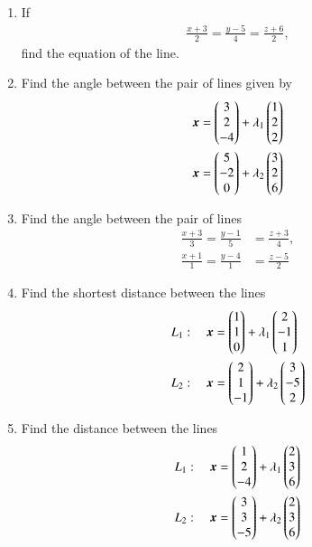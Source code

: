\begin{enumerate}[label=\arabic*.,ref=\thesubsection.\theenumi]
\item If
\begin{align}
\frac{x+3}{2} = \frac{y-5}{4} = \frac{z+6}{2}, 
\end{align}
%
find the equation of the line.
%
\item Find the angle between the pair of lines given by 
\begin{align}
\bm{x} &= \begin{pmatrix}3\\2\\-4\end{pmatrix} + \lambda_1\begin{pmatrix}1 \\ 2 \\2\end{pmatrix}
\\
\bm{x} &= \begin{pmatrix}5\\-2\\0\end{pmatrix} + \lambda_2\begin{pmatrix}3 \\ 2 \\6\end{pmatrix}
\end{align}
%
\item Find the angle between the pair of lines
\begin{align}
\frac{x+3}{3} = \frac{y-1}{5} &= \frac{z+3}{4}, 
\\
\frac{x+1}{1} = \frac{y-4}{1} &= \frac{z-5}{2} 
\end{align}
%
\item Find the shortest distance between the lines 
\begin{align}
L_1: \quad \bm{x} &= \begin{pmatrix}1\\1\\0\end{pmatrix} + \lambda_1\begin{pmatrix}2 \\ -1 \\1\end{pmatrix}
\\
L_2: \quad \bm{x} &= \begin{pmatrix}2\\1\\-1\end{pmatrix} + \lambda_2\begin{pmatrix}3 \\ -5 \\2\end{pmatrix}
\end{align}
\item Find the 
distance between the lines 
\begin{align}
L_1: \quad \bm{x} &= \begin{pmatrix}1\\2\\-4\end{pmatrix} + \lambda_1\begin{pmatrix}2 \\ 3 \\6\end{pmatrix}
\\
L_2: \quad \bm{x} &= \begin{pmatrix}3\\3\\-5\end{pmatrix} + \lambda_2\begin{pmatrix}2 \\ 3 \\6\end{pmatrix}
\end{align}

\end{enumerate}
